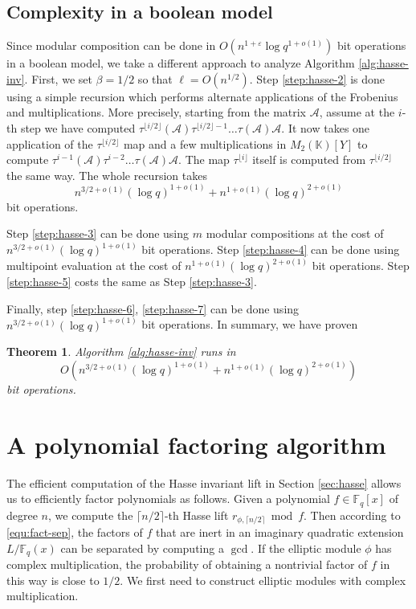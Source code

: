 \documentclass[12pt]{article}
\theoremstyle{plain}
\newtheorem{theorem}{Theorem}
\theoremstyle{definition}
\def\F{\ensuremath{\mathbb{F}}}
\def\K{\ensuremath{\mathbb{K}}}
\begin{document}
\subsection{Complexity in a boolean model}

Since modular composition can be done in $O(n^{1 + \varepsilon}\log q^{1 + o(1)})$ bit operations 
in a boolean model, we take a different approach to analyze Algorithm \ref{alg:hasse-inv}. First,  
we set $\beta = 1/2$ so that $\ell = O(n^{1/2})$. Step \ref{step:hasse-2} is done using a simple 
recursion which performs alternate applications of the Frobenius and multiplications. More 
precisely, starting from the matrix $\mathcal{A}$, assume at the $i$-th step we have computed 
$\tau^{\lfloor i/2 \rfloor}(\mathcal{A}) \tau^{\lfloor i/2 \rfloor-1} \ldots \tau(\mathcal{A}) 
\mathcal{A}$. It now takes one application of the $\tau^{\lfloor i/2 \rfloor}$ map and a few 
multiplications in $M_2(\K)[Y]$ to compute $\tau^{i-1}(\mathcal{A}) \tau^{i-2} \ldots 
\tau(\mathcal{A}) \mathcal{A}$. The map $\tau^{\lfloor i \rfloor}$ itself is computed from
$\tau^{\lfloor i/2 \rfloor}$ the same way. The whole recursion takes
\[ n^{3/2+o(1)} (\log q)^{1+o(1)} + n^{1+o(1)} (\log q)^{2+o(1)} \]
bit operations. 

Step \ref{step:hasse-3} can be done using $m$ modular compositions at the cost of $n^{3/2+o(1)} 
(\log q)^{1+o(1)}$ bit operations. Step \ref{step:hasse-4} can be done using multipoint evaluation 
\cite{vzGG} at the cost of $n^{1+o(1)} (\log q)^{2+o(1)}$ bit operations. Step \ref{step:hasse-5} 
costs the same as Step \ref{step:hasse-3}. 

Finally, step \ref{step:hasse-6}, \ref{step:hasse-7} can be done using $n^{3/2+o(1)} (\log 
q)^{1+o(1)}$ bit operations. In summary, we have proven 
\begin{theorem}
	\label{theo:hasse-inv}
	Algorithm \ref{alg:hasse-inv} runs in 
	\[O(n^{3/2+o(1)} (\log q)^{1+o(1)} + n^{1+o(1)} (\log q)^{2+o(1)})\]
	bit operations.
\end{theorem}



 
 

\section{A polynomial factoring algorithm}

The efficient computation of the Hasse invariant lift in Section \ref{sec:hasse} allows us to 
efficiently factor polynomials as follows. Given a polynomial $f \in \F_q[x]$ of degree $n$, we 
compute the $\lceil n / 2 \rceil$-th Hasse lift $r_{\phi, \lceil n / 2 \rceil} \bmod f$. Then 
according to \eqref{equ:fact-sep}, the factors of $f$ that are inert in an imaginary quadratic 
extension $L/\F_q(x)$ can be separated by computing a $\gcd$. If the elliptic module $\phi$ has 
complex multiplication, the probability of obtaining a nontrivial factor of $f$ in this way is 
close to $1/2$. We first need to construct elliptic modules with complex multiplication.
\end{document}
